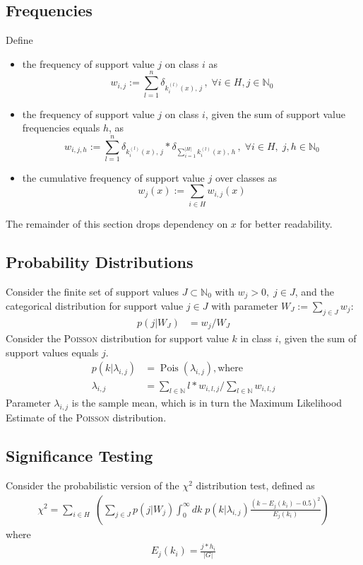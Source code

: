 \documentclass{article}
\begin{document}
\subsection{Frequencies}
Define
\begin{itemize}
  \item the frequency of support value $j$ on class $i$ as 
    \begin{equation}
        w_{i,j}:=\sum_{l=1}^n \delta_{k_i^{(l)}(x),\, j}\, , \; \forall i \in H, j \in \mathbb{N}_0
    \end{equation}
  \item the frequency of support value $j$ on class $i$, given the sum of support value frequencies equals $h$, as 
    \begin{equation}
      w_{i,j,h}:=\sum_{l=1}^n \delta_{k_i^{(l)}(x),\, j} * \delta_{\sum_{i=1}^{\vert H \vert}k_i^{(l)}(x),\, h}\, , \; \forall i \in H, \; j,h \in \mathbb{N}_0
    \end{equation}
  \item the cumulative frequency of support value $j$ over classes as 
    \begin{equation}
      w_j(x):=\sum_{i \in H}w_{i,j}(x)
    \end{equation}
\end{itemize}
The remainder of this section drops dependency on $x$ for better readability.

\subsection{Probability Distributions}
Consider the finite set of support values $J \subset \mathbb{N}_0$ with $w_j > 0, \; j \in J$, and the categorical distribution for support value $j \in J$ with parameter $W_J:=\sum_{j \in J} w_j$:
\begin{align}
  p(j|W_J) &= w_j/W_J
\end{align}
Consider the \textsc{Poisson} distribution for support value $k$ in class $i$, given the sum of support values equals $j$.
\begin{align}
  p(k\vert\lambda_{i,j}) &= \operatorname{Pois}\left(\lambda_{i,j}\right), \text{where}\\
  \lambda_{i,j}&=\sum_{l \in \mathbb{N}} l*w_{i,l,j} / \sum_{l \in \mathbb{N}} w_{i,l,j}
\end{align}
Parameter $\lambda_{i,j}$ is the sample mean, which is in turn the Maximum Likelihood Estimate of the \textsc{Poisson} distribution.

\subsection{Significance Testing}
\label{ss:significanceTesting}
Consider the probabilistic version of the $\chi^2$ distribution test, defined as
\begin{align}
  \chi^2 = \sum_{i \in H}\; \left( \sum_{j \in J}p(j|W_j) \int_0^{\infty}dk\; p(k|\lambda_{i,j}) \frac{(k-E_j(k_i)-0.5)^2}{E_j(k_i)} \right)
\end{align}
where 
\begin{align}
  E_j(k_i) = \frac{j * h_i}{\vert G\vert}
\end{align}
\end{document}
